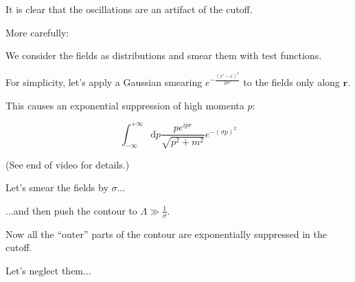 \documentclass{beamer}
\newcommand{\integrand}{\frac{p e^{ipr}}{\sqrt{p^2 + m^2}}}
\newcommand{\vr}{\mathbf{r}}
\newcommand{\diffop}{\mathop{}\!\mathrm{d}}
\newcommand{\dip}{\diffop p}
\newcommand{\intii}{\int_{-\infty}^{+\infty}}
\begin{document}
\begin{frame}
It is clear that the oscillations are an \alert{artifact of the cutoff}.

\bigskip
\pause
More carefully:

\pause
We consider the fields as \alert{distributions} and \alert{smear} them with test functions.
\end{frame}


\begin{frame}
For simplicity, let's apply a \alert{Gaussian} smearing $e^{-\frac{(x' - x)^2}{2\sigma^2}}$ to the fields only along $\vr$.

\medskip
\pause
This causes an exponential suppression of high momenta $p$:

\begin{equation*}
\intii \dip \integrand e^{-(\sigma p)^2}
\end{equation*}

\pause
\medskip
(See end of video for details.)
\end{frame}



\begin{frame}
Let's smear the fields by $\sigma$...

\medskip
\pause
...and then push the contour to $\Lambda \gg \frac{1}{\sigma}$.
\end{frame}




\begin{frame}
Now all the ``outer'' parts of the contour are exponentially suppressed in the cutoff.

\medskip
\pause
Let's neglect them...
\end{frame}
\end{document}
